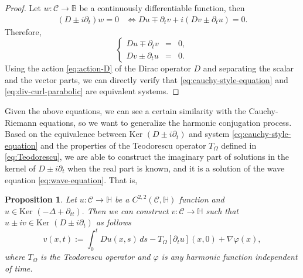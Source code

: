 \documentclass[12pt]{article}
\newtheorem{proposition}[theorem]{Proposition}
\def\H{\mathbb{H}}
\def\iff{\Leftrightarrow}
\def\H{\mathbb{H}}
\def\B{\mathbb{B}}
\def\iff{\Leftrightarrow}
\let\phi\varphi
\begin{document}
\begin{proof}
    Let $w:\mathscr{C}\to\B$ be a continuously differentiable function, then
    \begin{align*}
        (D\pm i\partial_t)w=0&\iff
        Du\mp \partial_tv+i(Dv\pm \partial_tu)=0.
    \end{align*}
    Therefore,
    \begin{equation}\label{eq:cauchy-style-equation}
        \left\{
            \begin{array}{rcl}
                Du\mp \partial_tv&=&0,\\
                Dv\pm \partial_tu&=&0.
            \end{array}
        \right.
    \end{equation}
    Using the action \eqref{eq:action-D} of the Dirac operator $D$ and separating the scalar and the vector parts, we can directly verify that \eqref{eq:cauchy-style-equation} and \eqref{eq:div-curl-parabolic} are equivalent systems.
\end{proof}    

Given the above equations, we can see a certain similarity with the Cauchy-Riemann equations, so we want to generalize the harmonic conjugation process. Based on the equivalence between $\text{Ker }(D\pm i\partial_t)$ and system \eqref{eq:cauchy-style-equation} and the properties of the Teodorescu operator $T_{\Omega}$ defined in \eqref{eq:Teodorescu}, we are able to construct the imaginary part of solutions in the kernel of $D\pm i\partial_t$ when the real part is known, and it is a solution of the wave equation \eqref{eq:wave-equation}. That is, 

\begin{proposition}\label{prop:completation}
    Let $u:\mathscr{C}\to\H$ be a $C^{2,2}(\mathscr{C},\mathbb{H})$ function and $u\in\text{Ker }(-\Delta+\partial_{tt}).$ Then we can construct $v:\mathscr{C}\to\H$ such that $u\pm iv\in\text{Ker }(D\pm i\partial_t)$ as follows
    \begin{equation}\label{Riemann:Cauchy:Style:equation}
        v(x,t):=\int_0^t Du(x,s)\,ds-T_\Omega[\partial_t u](x,0)+\nabla\phi(x),
    \end{equation}
    where $T_{\Omega}$ is the Teodorescu operator and $\phi$ is any harmonic function independent of time.
\end{proposition}
\end{document}
